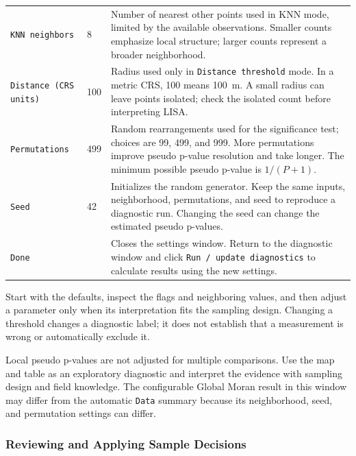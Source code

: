 \documentclass[11pt,a4paper]{article}
\begin{document}
\begin{longtable}{P{0.24\textwidth}P{0.12\textwidth}P{0.55\textwidth}}
\texttt{KNN neighbors} & 8 & Number of nearest other points used in KNN mode, limited by the available observations. Smaller counts emphasize local structure; larger counts represent a broader neighborhood. \\
\texttt{Distance (CRS units)} & 100 & Radius used only in \texttt{Distance threshold} mode. In a metric CRS, 100 means 100~m. A small radius can leave points isolated; check the isolated count before interpreting LISA. \\
\texttt{Permutations} & 499 & Random rearrangements used for the significance test; choices are 99, 499, and 999. More permutations improve pseudo p-value resolution and take longer. The minimum possible pseudo p-value is $1/(P+1)$. \\
\texttt{Seed} & 42 & Initializes the random generator. Keep the same inputs, neighborhood, permutations, and seed to reproduce a diagnostic run. Changing the seed can change the estimated pseudo p-values. \\
\texttt{Done} & & Closes the settings window. Return to the diagnostic window and click \texttt{Run / update diagnostics} to calculate results using the new settings. \\
\bottomrule
\end{longtable}

Start with the defaults, inspect the flags and neighboring values, and then adjust a parameter only when its interpretation fits the sampling design. Changing a threshold changes a diagnostic label; it does not establish that a measurement is wrong or automatically exclude it.

\begin{infobox}
Local pseudo p-values are not adjusted for multiple comparisons. Use the map and table as an exploratory diagnostic and interpret the evidence with sampling design and field knowledge. The configurable Global Moran result in this window may differ from the automatic \texttt{Data} summary because its neighborhood, seed, and permutation settings can differ.
\end{infobox}

\subsubsection{Reviewing and Applying Sample Decisions}
\end{document}

